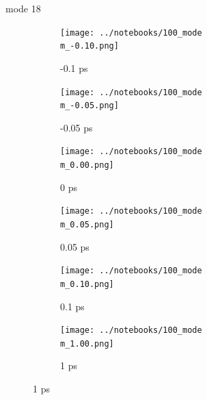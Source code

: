 \documentclass{beamer}
\begin{document}
\renewcommand\m{18}
\begin{frame}{mode \m}
	\begin{figure}
		\centering
		\begin{subfigure}[b]{\w\textwidth}
			\centering
			\texttt{[image: ../notebooks/100\_mode\\m\_-0.10.png]}
			\caption{-0.1 ps}
		\end{subfigure}
		\begin{subfigure}[b]{\w\textwidth}
			\centering
			\texttt{[image: ../notebooks/100\_mode\\m\_-0.05.png]}
			\caption{-0.05 ps}
		\end{subfigure}
		\begin{subfigure}[b]{\w\textwidth}
			\centering
			\texttt{[image: ../notebooks/100\_mode\\m\_0.00.png]}
			\caption{0 ps}
		\end{subfigure}
		\begin{subfigure}[b]{\w\textwidth}
			\centering
			\texttt{[image: ../notebooks/100\_mode\\m\_0.05.png]}
			\caption{0.05 ps}
		\end{subfigure}
		\begin{subfigure}[b]{\w\textwidth}
			\centering
			\texttt{[image: ../notebooks/100\_mode\\m\_0.10.png]}
			\caption{0.1 ps}
		\end{subfigure}
		\begin{subfigure}[b]{\w\textwidth}
			\centering
			\texttt{[image: ../notebooks/100\_mode\\m\_1.00.png]}
			\caption{1 ps}
		\end{subfigure}
	\end{figure}
\end{frame}
\end{document}
